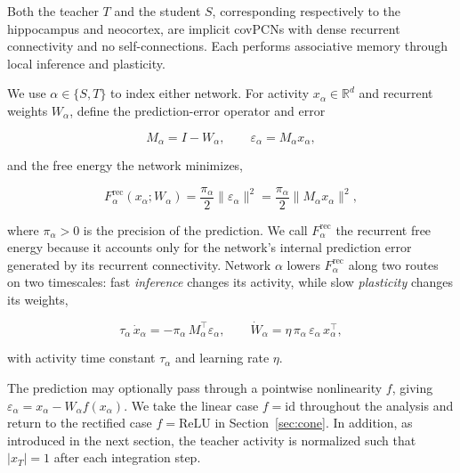 \documentclass[10pt,letterpaper]{article}
\theoremstyle{plain}
\theoremstyle{remark}
\begin{document}
Both the teacher $T$ and the student $S$, corresponding respectively to the hippocampus and neocortex, are implicit covPCNs with dense recurrent connectivity and no self-connections. Each performs associative memory through local inference and plasticity.
\par\vspace{\baselineskip}\noindent
We use $\alpha\in\{S,T\}$ to index either network. For activity $x_\alpha\in\mathbb R^d$ and recurrent weights $W_\alpha$, define the prediction-error operator and error

\begin{equation}
M_\alpha=I-W_\alpha,
\qquad
\varepsilon_\alpha=M_\alpha x_\alpha,
\label{eq:single-error}
\end{equation}

and the free energy the network minimizes,

\begin{equation}
F_\alpha^{\mathrm{rec}}(x_\alpha;W_\alpha)=\frac{\pi_\alpha}{2}\|\varepsilon_\alpha\|^2
=\frac{\pi_\alpha}{2}\|M_\alpha x_\alpha\|^2,
\label{eq:single-energy}
\end{equation}

where $\pi_\alpha>0$ is the precision of the prediction. We call $F_\alpha^{\mathrm{rec}}$ the recurrent free energy because it accounts only for the network's internal prediction error generated by its recurrent connectivity. Network $\alpha$ lowers $F_\alpha^{\mathrm{rec}}$ along two routes on two timescales: fast \emph{inference} changes its activity, while slow \emph{plasticity} changes its weights,

\begin{equation}
\tau_\alpha\,\dot x_\alpha=-\pi_\alpha\,M_\alpha^\top\varepsilon_\alpha,
\qquad
\dot W_\alpha=\eta\,\pi_\alpha\,\varepsilon_\alpha\,x_\alpha^\top,
\label{eq:single-dynamics}
\end{equation}

with activity time constant $\tau_\alpha$ and learning rate $\eta$.

The prediction may optionally pass through a pointwise nonlinearity $f$, giving $\varepsilon_\alpha=x_\alpha-W_\alpha f(x_\alpha)$. We take the linear case $f=\mathrm{id}$ throughout the analysis and return to the rectified case $f=\mathrm{ReLU}$ in Section~\ref{sec:cone}.
In addition, as introduced in the next section, the teacher activity is normalized such that $|x_T|=1$ after each integration step.
\end{document}
